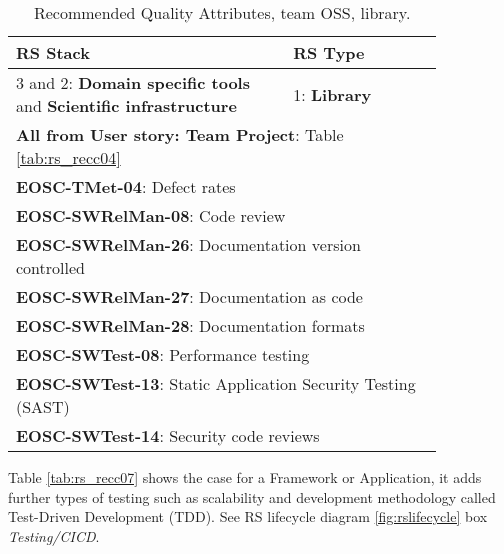 \begin{table}[h]
  \centering
  \scriptsize
  \begin{tabular}{|p{0.55\linewidth}|p{0.3\linewidth}|} \hline

    \textbf{RS Stack} & \textbf{RS Type} \\ \hline \hline
    3 and 2: \textbf{Domain specific tools} and  \textbf{Scientific infrastructure} & 1: \textbf{Library} \\ \hline
    \multicolumn{2}{|l|}{\textbf{All from User story: Team Project}: Table \ref{tab:rs_recc04}} \\ \hline
    \multicolumn{2}{|l|}{\textbf{EOSC-TMet-04}: Defect rates} \\ \hline
    \multicolumn{2}{|l|}{\textbf{EOSC-SWRelMan-08}: Code review} \\ \hline
    \multicolumn{2}{|l|}{\textbf{EOSC-SWRelMan-26}: Documentation version controlled} \\ \hline
    \multicolumn{2}{|l|}{\textbf{EOSC-SWRelMan-27}: Documentation as code} \\ \hline
    \multicolumn{2}{|l|}{\textbf{EOSC-SWRelMan-28}: Documentation formats} \\ \hline
    \multicolumn{2}{|l|}{\textbf{EOSC-SWTest-08}: Performance testing} \\ \hline
    \multicolumn{2}{|l|}{\textbf{EOSC-SWTest-13}: Static Application Security Testing (SAST)} \\ \hline
    \multicolumn{2}{|l|}{\textbf{EOSC-SWTest-14}: Security code reviews} \\ \hline

  \end{tabular}
  \caption{Recommended Quality Attributes, team OSS, library.}
  \label{tab:rs_recc06}
\end{table}

Table \ref{tab:rs_recc07} shows the case for a Framework or Application, it adds further types of testing such as scalability and development methodology called Test-Driven Development (TDD). See RS lifecycle diagram \ref{fig:rslifecycle} box \textit{Testing/CICD}.

